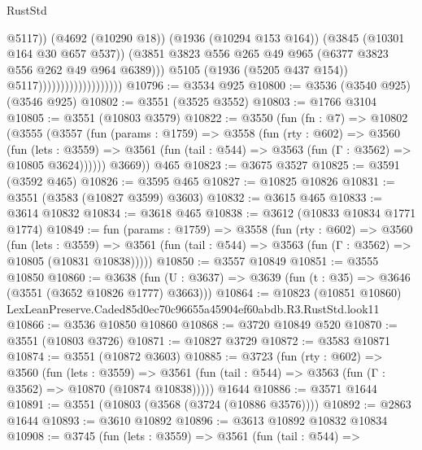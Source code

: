 \begin{lexlean}{RustStd}
\begin{coremodule}
                                                @5117))
                                            (@4692 (@10290 @18))
                                            (@1936 (@10294 @153 @164))
                                            (@3845 (@10301 @164 @30 @657 @537))
                                            (@3851
                                              @3823
                                              @556
                                              @265
                                              @49
                                              @965
                                              (@6377 @3823 @556 @262 @49 @964 @6389)))
                                          @5105
                                          (@1936 (@5205 @437 @154))
                                          @5117)))))))))))))))))))
@10796 := @3534 @925
@10800 := @3536 (@3540 @925) (@3546 @925)
@10802 := @3551 (@3525 @3552)
@10803 := @1766 @3104
@10805 := @3551 (@10803 @3579)
@10822 := @3550
    (fun (fn : @7) =>
    @10802
      (@3555
        (@3557
          (fun (params : @1759) =>
          @3558
            (fun (rty : @602) =>
            @3560
              (fun (lets : @3559) =>
              @3561 (fun (tail : @544) => @3563 (fun (Γ : @3562) => @10805 @3624))))))
        @3669))
    @465
@10823 := @3675 @3527
@10825 := @3591 (@3592 @465)
@10826 := @3595 @465
@10827 := @10825 @10826
@10831 := @3551 (@3583 (@10827 @3599) @3603)
@10832 := @3615 @465
@10833 := @3614 @10832
@10834 := @3618 @465
@10838 := @3612 (@10833 @10834 @1771 @1774)
@10849 := fun (params : @1759) =>
  @3558
    (fun (rty : @602) =>
    @3560
      (fun (lets : @3559) =>
      @3561 (fun (tail : @544) => @3563 (fun (Γ : @3562) => @10805 (@10831 @10838)))))
@10850 := @3557 @10849
@10851 := @3555 @10850
@10860 := @3638
    (fun (U : @3637) => @3639 (fun (t : @35) => @3646 (@3551 (@3652 @10826 @1777) @3663)))
@10864 := @10823 (@10851 @10860) LexLeanPreserve.Caded85d0ec70c96655a45904ef60abdb.R3.RustStd.look11
@10866 := @3536 @10850 @10860
@10868 := @3720 @10849 @520
@10870 := @3551 (@10803 @3726)
@10871 := @10827 @3729
@10872 := @3583 @10871
@10874 := @3551 (@10872 @3603)
@10885 := @3723
    (fun (rty : @602) =>
    @3560
      (fun (lets : @3559) =>
      @3561 (fun (tail : @544) => @3563 (fun (Γ : @3562) => @10870 (@10874 @10838)))))
    @1644
@10886 := @3571 @1644
@10891 := @3551 (@10803 (@3568 (@3724 (@10886 @3576))))
@10892 := @2863 @1644
@10893 := @3610 @10892
@10896 := @3613 @10892 @10832 @10834
@10908 := @3745
    (fun (lets : @3559) =>
    @3561
      (fun (tail : @544) =>

\end{coremodule}
\end{lexlean}
